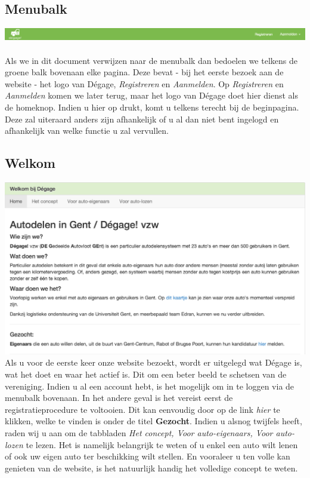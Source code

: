 \documentclass[11pt,a4paper,oneside]{article}
\begin{document}
\subsection{Menubalk}
\includegraphics[scale=0.35]{img/menubalk} \\\\
Als we in dit document verwijzen naar de menubalk dan bedoelen we telkens de groene balk bovenaan elke pagina. Deze bevat - bij het eerste bezoek aan de website - het logo van D\'egage, \textit{Registreren} en \textit{Aanmelden}. Op \textit{Registreren} en \textit{Aanmelden} komen we later terug, maar het logo van D\'egage doet hier dienst als de homeknop. Indien u hier op drukt, komt u telkens terecht bij de beginpagina. Deze zal uiteraard anders zijn afhankelijk of u al dan niet bent ingelogd en afhankelijk van welke functie u zal vervullen.
\subsection{Welkom}
\includegraphics[scale=0.60]{img/home}
\\
Als u voor de eerste keer onze website bezoekt, wordt er uitgelegd wat D\'egage is, wat het doet en waar het actief is. Dit om een beter beeld te schetsen van de vereniging. Indien u al een account hebt, is het mogelijk om in te loggen via de menubalk bovenaan. In het andere geval is het vereist eerst de registratieprocedure te voltooien. Dit kan eenvoudig door op de link \textit{hier} te klikken, welke te vinden is onder de titel \textbf{Gezocht}. Indien u alsnog twijfels heeft, raden wij u aan om de tabbladen \textit{Het concept, Voor auto-eigenaars, Voor auto-lozen} te lezen. Het is namelijk belangrijk te weten of u enkel een auto wilt lenen of ook uw eigen auto ter beschikking wilt stellen. En vooraleer u ten volle kan genieten van de website, is het natuurlijk handig het volledige concept te weten.\\\\
\end{document}
